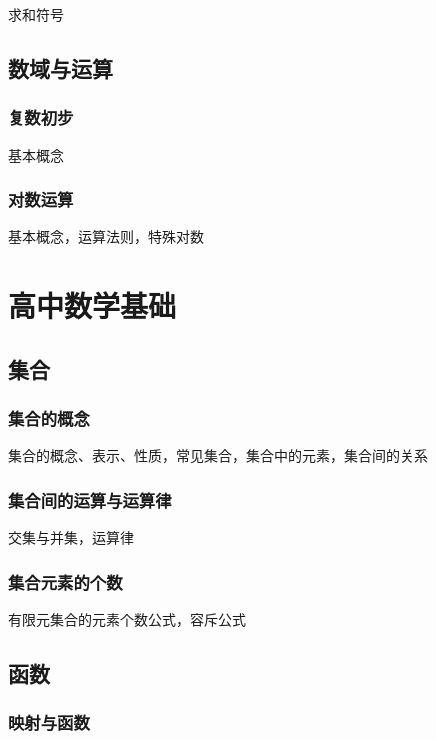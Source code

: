 \documentclass[lang=cn, zihao=4.5]{elegantbook}
\begin{document}
求和符号

\chapter{数域与运算}

\section{复数初步}

基本概念

\section{对数运算}

基本概念，运算法则，特殊对数

\part{高中数学基础}

\setcounter{chapter}{0}
\chapter{集合}

\section{集合的概念}

集合的概念、表示、性质，常见集合，集合中的元素，集合间的关系

\section{集合间的运算与运算律}

交集与并集，运算律

\section{集合元素的个数}

有限元集合的元素个数公式，容斥公式

\chapter{函数}

\section{映射与函数}
\end{document}
